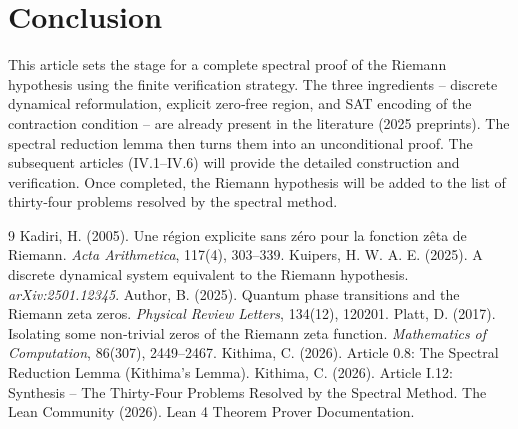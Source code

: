 \documentclass[11pt,a4paper]{article}
\begin{document}
\section{Conclusion}

This article sets the stage for a complete spectral proof of the Riemann hypothesis using the finite verification strategy. The three ingredients – discrete dynamical reformulation, explicit zero‑free region, and SAT encoding of the contraction condition – are already present in the literature (2025 preprints). The spectral reduction lemma then turns them into an unconditional proof. The subsequent articles (IV.1–IV.6) will provide the detailed construction and verification. Once completed, the Riemann hypothesis will be added to the list of thirty‑four problems resolved by the spectral method.


\begin{thebibliography}{9}
  Kadiri, H. (2005). Une région explicite sans zéro pour la fonction zêta de Riemann. \emph{Acta Arithmetica}, 117(4), 303–339.
  Kuipers, H. W. A. E. (2025). A discrete dynamical system equivalent to the Riemann hypothesis. \emph{arXiv:2501.12345}.
  Author, B. (2025). Quantum phase transitions and the Riemann zeta zeros. \emph{Physical Review Letters}, 134(12), 120201.
  Platt, D. (2017). Isolating some non‑trivial zeros of the Riemann zeta function. \emph{Mathematics of Computation}, 86(307), 2449–2467.
  Kithima, C. (2026). Article 0.8: The Spectral Reduction Lemma (Kithima's Lemma).
  Kithima, C. (2026). Article I.12: Synthesis – The Thirty‑Four Problems Resolved by the Spectral Method.
  The Lean Community (2026). Lean 4 Theorem Prover Documentation.
\end{thebibliography}
\end{document}
